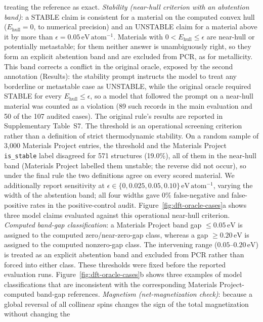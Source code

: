 \documentclass[pdflatex,sn-nature]{sn-jnl}
\newcommand{\rev}[1]{#1}
\newcommand{\rev}[1]{{\color{blue}#1}}
\begin{document}
treating the reference as exact. \emph{Stability (\rev{near-hull criterion with an abstention band})}: \rev{a STABLE claim is consistent
for a material on the computed convex hull ($E_{\mathrm{hull}}=0$, to numerical precision) and an UNSTABLE
claim for a material above it by more than $\epsilon=0.05\,\mathrm{eV\,atom^{-1}}$. Materials with
$0<E_{\mathrm{hull}}\le\epsilon$ are near-hull or potentially metastable; for them neither answer is
unambiguously right, so they form an explicit abstention band and are excluded from PCR, as for
metallicity. This band corrects a conflict in the original oracle, exposed by the second annotation
(Results): the stability prompt instructs the model to treat any borderline or metastable case as
UNSTABLE, while the original oracle required STABLE for every $E_{\mathrm{hull}}\le\epsilon$, so a model
that followed the prompt on a near-hull material was counted as a violation (89 such records in the main
evaluation and 50 of the 107 audited cases). The original rule's results are reported in Supplementary
Table~S7.} The threshold is an operational screening criterion rather than a definition of strict
thermodynamic stability. On a random sample of 3,000 Materials Project entries, the threshold and the
Materials Project \texttt{is\_stable} label disagreed for 571 structures (19.0\%), all of them in the
near-hull band (Materials Project labelled them unstable; the reverse did not occur)\rev{, so under the
final rule the two definitions agree on every scored material}. We additionally report sensitivity at
$\epsilon\in\{0,0.025,0.05,0.10\}\,\mathrm{eV\,atom^{-1}}$, varying the width of the abstention band; all
four widths gave 0\% false-negative and false-positive rates in the positive-control audit.
Figure~\ref{fig:dft-oracle-cases}a shows three model claims evaluated against this operational near-hull criterion. 
\emph{Computed band-gap classification}: a Materials Project band gap
$\leq0.05\,\mathrm{eV}$ is assigned to the computed zero/near-zero-gap
class, whereas a gap $\geq0.20\,\mathrm{eV}$ is assigned to the computed
nonzero-gap class. The intervening range
($0.05$--$0.20\,\mathrm{eV}$) is treated as an explicit abstention band
and excluded from PCR rather than forced into either class. These thresholds
were fixed before the reported evaluation runs. Figure~\ref{fig:dft-oracle-cases}b
shows three examples of model classifications that are inconsistent with the
corresponding Materials Project-computed band-gap references.
\emph{Magnetism (net-magnetization check)}: because a global reversal of all
collinear spins changes the sign of the total magnetization without changing the
\end{document}
